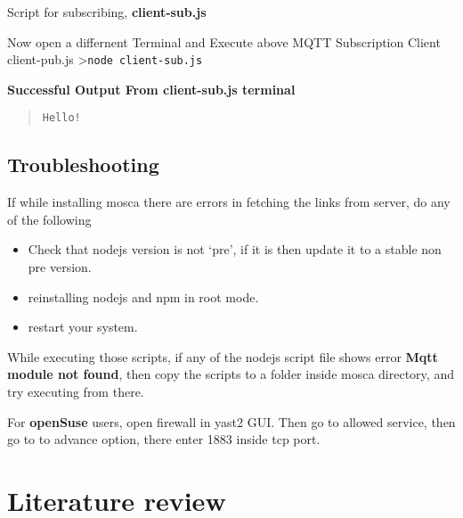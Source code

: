\documentclass[16pt]{article}
\begin{document}
\vspace{0.5cm}
Script for subscribing, \textbf{client-sub.js}

Now open a differnent Terminal and Execute above MQTT Subscription
Client client-pub.js \textgreater{}\texttt{node client-sub.js}

\vspace{0.5cm}
\textbf{Successful Output From client-sub.js terminal}

\begin{quote}
\texttt{Hello!}
\end{quote}

\vspace{0.5cm}

\subsection{Troubleshooting}


If while installing mosca there are errors in fetching the links from
server, do any of the following 

\begin{itemize}

\item Check that nodejs version is not
`pre', if it is then update it to a stable non pre version.
\item reinstalling nodejs and npm in root mode. 
\item restart your system.

\end{itemize}

While executing those scripts, if any of the nodejs script file shows
error \textbf{Mqtt module not found}, then copy the scripts to a folder
inside mosca directory, and try executing from there.

For \textbf{openSuse} users, open firewall in yast2 GUI. Then go to
allowed service, then go to to advance option, there enter 1883 inside
tcp port.

  
\vspace{2cm}

\section{Literature review}
\vspace{0.5cm}
\end{document}
